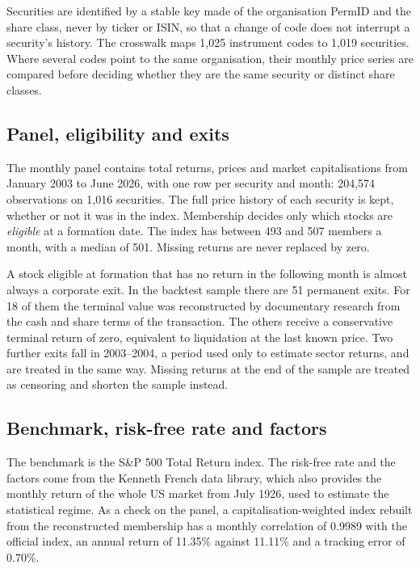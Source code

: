 \documentclass[11pt,a4paper]{article}
\begin{document}
Securities are identified by a stable key made of the organisation PermID and the share class, never by ticker or ISIN, so that a change of code does not interrupt a security's history. The crosswalk maps 1,025 instrument codes to 1,019 securities. Where several codes point to the same organisation, their monthly price series are compared before deciding whether they are the same security or distinct share classes.

\subsection{Panel, eligibility and exits}

The monthly panel contains total returns, prices and market capitalisations from January 2003 to June 2026, with one row per security and month: 204,574 observations on 1,016 securities. The full price history of each security is kept, whether or not it was in the index. Membership decides only which stocks are \emph{eligible} at a formation date. The index has between 493 and 507 members a month, with a median of 501. Missing returns are never replaced by zero.

A stock eligible at formation that has no return in the following month is almost always a corporate exit. In the backtest sample there are 51 permanent exits. For 18 of them the terminal value was reconstructed by documentary research from the cash and share terms of the transaction. The others receive a conservative terminal return of zero, equivalent to liquidation at the last known price. Two further exits fall in 2003--2004, a period used only to estimate sector returns, and are treated in the same way. Missing returns at the end of the sample are treated as censoring and shorten the sample instead.

\subsection{Benchmark, risk-free rate and factors}

The benchmark is the S\&P 500 Total Return index. The risk-free rate and the factors come from the Kenneth French data library, which also provides the monthly return of the whole US market from July 1926, used to estimate the statistical regime. As a check on the panel, a capitalisation-weighted index rebuilt from the reconstructed membership has a monthly correlation of 0.9989 with the official index, an annual return of 11.35\% against 11.11\% and a tracking error of 0.70\%.
\end{document}
